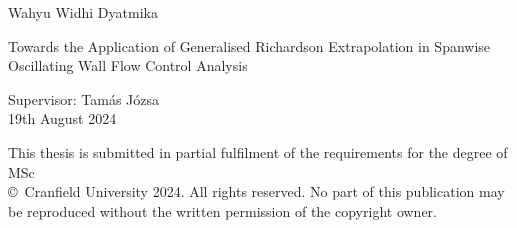 {    \vfill
    Wahyu Widhi Dyatmika\par
    \vfill
    Towards the Application of Generalised Richardson Extrapolation in Spanwise Oscillating Wall Flow Control Analysis\par
    \vfill
    Supervisor: Tamás Józsa\\
     19th August 2024\par
     \vfill
     This thesis is submitted in partial fulfilment of the requirements for the degree of MSc\\%
     \vfill
     \copyright\ Cranfield University 2024. All rights reserved.
    No part of this publication may be reproduced without the written
     permission of the copyright owner.
    \cleardoublepage
    \makeatother
}
